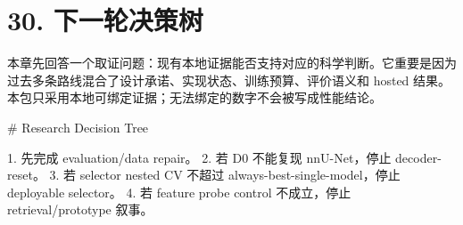 \section{30. 下一轮决策树}

本章先回答一个取证问题：现有本地证据能否支持对应的科学判断。它重要是因为过去多条路线混合了设计承诺、实现状态、训练预算、评价语义和 hosted 结果。本包只采用本地可绑定证据；无法绑定的数字不会被写成性能结论。



# Research Decision Tree

1. 先完成 evaluation/data repair。
2. 若 D0 不能复现 nnU-Net，停止 decoder-reset。
3. 若 selector nested CV 不超过 always-best-single-model，停止 deployable selector。
4. 若 feature probe control 不成立，停止 retrieval/prototype 叙事。




\clearpage